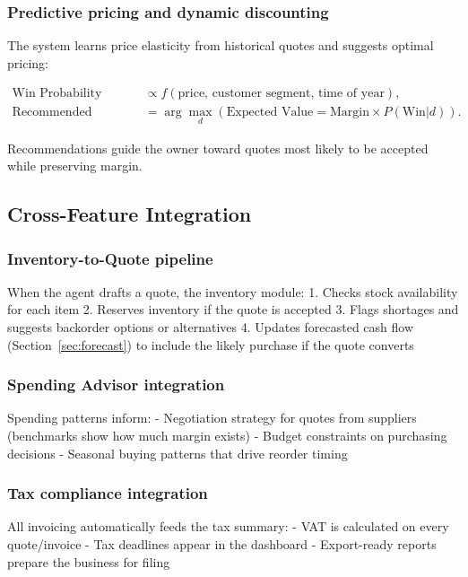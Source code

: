 \documentclass[10pt,a4paper]{article}
\begin{document}
\subsubsection{Predictive pricing and dynamic discounting}

The system learns price elasticity from historical quotes and suggests optimal pricing:

\begin{align*}
\text{Win Probability} &\propto f(\text{price, customer segment, time of year}),\\
\text{Recommended Discount} &= \arg\max_d (\text{Expected Value} = \text{Margin} \times P(\text{Win}|d)).
\end{align*}

Recommendations guide the owner toward quotes most likely to be accepted while preserving margin.

\subsection{Cross-Feature Integration}

\subsubsection{Inventory-to-Quote pipeline}

When the agent drafts a quote, the inventory module:
1. Checks stock availability for each item
2. Reserves inventory if the quote is accepted
3. Flags shortages and suggests backorder options or alternatives
4. Updates forecasted cash flow (Section~\ref{sec:forecast}) to include the likely purchase if the quote converts

\subsubsection{Spending Advisor integration}

Spending patterns inform:
- Negotiation strategy for quotes from suppliers (benchmarks show how much margin exists)
- Budget constraints on purchasing decisions
- Seasonal buying patterns that drive reorder timing

\subsubsection{Tax compliance integration}

All invoicing automatically feeds the tax summary:
- VAT is calculated on every quote/invoice
- Tax deadlines appear in the dashboard
- Export-ready reports prepare the business for filing
\end{document}
